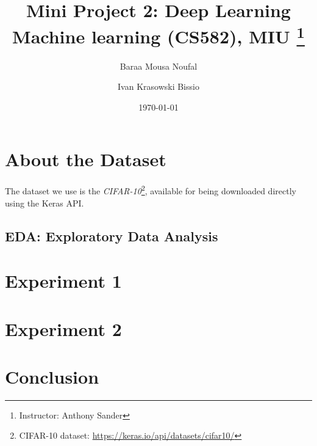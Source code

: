 \documentclass[titlepage, 11pt]{article}
\title{
	\textbf{Mini Project 2: Deep Learning} \\
	Machine learning (CS582), MIU \thanks{Instructor: Anthony Sander}
}
\author{
    Baraa Mousa Noufal \and Ivan Krasowski Bissio
}
\date{\today}
\begin{document}
\maketitle
\tableofcontents

\begin{abstract}
	
\end{abstract}

\section{About the Dataset}
The dataset we use is the \emph{CIFAR-10}\footnote{CIFAR-10 dataset: \href{https://keras.io/api/datasets/cifar10/}{https://keras.io/api/datasets/cifar10/}},
available for being downloaded directly using the Keras API.

\subsection{EDA: Exploratory Data Analysis}


\section{Experiment 1}


\section{Experiment 2}


\clearpage
\section{Conclusion}

\end{document}
